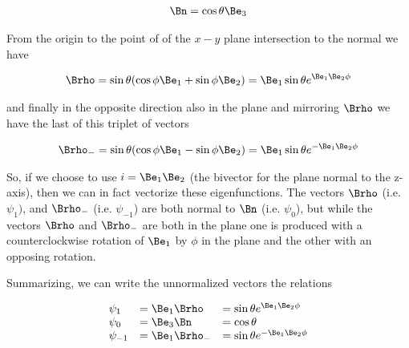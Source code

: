 \begin{align}\label{eqn:foo3}
\Bn = \cos\theta \Be_3 
\end{align}

From the origin to the point of of the $x-y$ plane intersection to the normal we have

\begin{align}\label{eqn:foo4}
\Brho = \sin\theta (\cos\phi \Be_1 + \sin\phi \Be_2) = \Be_1 \sin\theta e^{\Be_1 \Be_2 \phi}
\end{align}

and finally in the opposite direction also in the plane and mirroring $\Brho$ we have the last of this triplet of vectors

\begin{align}\label{eqn:foo5}
\Brho_{-} = \sin\theta (\cos\phi \Be_1 - \sin\phi \Be_2) = \Be_1 \sin\theta e^{-\Be_1 \Be_2 \phi}
\end{align}

So, if we choose to use $i=\Be_1 \Be_2$ (the bivector for the plane normal to the z-axis), then we can in fact vectorize these eigenfunctions.  The vectors $\Brho$ (i.e. $\psi_1)$, and $\Brho_{-}$ (i.e. $\psi_{-1}$) are both normal to $\Bn$ (i.e. $\psi_0$), but while the vectors $\Brho$ and $\Brho_{-}$ are both in the plane one is produced with a counterclockwise rotation of $\Be_1$ by $\phi$ in the plane and the other with an opposing rotation.

Summarizing, we can write the unnormalized vectors the relations

\begin{equation*}
\begin{array}{l l l}%
\psi_1 &= \Be_1 \Brho &= \sin\theta e^{\Be_1\Be_2 \phi} \\
\psi_0 &= \Be_3 \Bn &= \cos\theta \\
\psi_{-1} &= \Be_1 \Brho_{-} &= \sin\theta e^{-\Be_1\Be_2 \phi}
\end{array}
\end{equation*}


